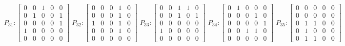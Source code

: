     $$
        P_{31} : \begin{bmatrix}
            0 & 0 & 1 & 0 & 0 \\
            0 & 1 & 0 & 0 & 1 \\
            0 & 0 & 0 & 0 & 1 \\
            1 & 0 & 0 & 0 & 0 \\
            0 & 0 & 0 & 0 & 0
        \end{bmatrix}
        \;
         P_{32} : \begin{bmatrix}
            0 & 0 & 0 & 1 & 0 \\
            0 & 0 & 0 & 1 & 0 \\
            1 & 0 & 0 & 1 & 0 \\
            0 & 0 & 0 & 1 & 0 \\
            0 & 0 & 0 & 0 & 0
        \end{bmatrix}
        \;
        P_{33} : \begin{bmatrix}
            0 & 0 & 1 & 1 & 0 \\
            0 & 0 & 1 & 0 & 1 \\
            0 & 0 & 0 & 0 & 0 \\
            1 & 0 & 0 & 0 & 0 \\
            0 & 0 & 0 & 0 & 0
        \end{bmatrix}
        \;
        P_{34} : \begin{bmatrix}
            0 & 1 & 0 & 0 & 0 \\
            0 & 0 & 0 & 1 & 0 \\
            0 & 0 & 0 & 0 & 1 \\
            0 & 0 & 1 & 1 & 0 \\
            0 & 0 & 0 & 0 & 0
        \end{bmatrix}
        \;
        P_{35} : \begin{bmatrix}
            0 & 0 & 0 & 0 & 0 \\
            0 & 0 & 0 & 0 & 0 \\
            0 & 1 & 1 & 0 & 0 \\
            0 & 1 & 0 & 0 & 0 \\
            0 & 1 & 1 & 0 & 0
        \end{bmatrix}
    $$


